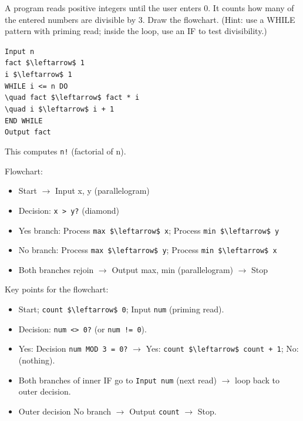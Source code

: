 \documentclass[11pt]{article}
\begin{document}
\begin{exercice}
A program reads positive integers until the user enters 0. It counts how many of the entered numbers are divisible by 3. Draw the flowchart. (Hint: use a WHILE pattern with priming read; inside the loop, use an IF to test divisibility.)
\end{exercice}

\begin{corrige}[Exercise 1]
\begin{center}
\texttt{Input n}\\
\texttt{fact \$\textbackslash{}leftarrow\$ 1}\\
\texttt{i \$\textbackslash{}leftarrow\$ 1}\\
\texttt{WHILE i <= n DO}\\
\texttt{\textbackslash{}quad fact \$\textbackslash{}leftarrow\$ fact * i}\\
\texttt{\textbackslash{}quad i \$\textbackslash{}leftarrow\$ i + 1}\\
\texttt{END WHILE}\\
\texttt{Output fact}
\end{center}
This computes \texttt{n!} (factorial of n).
\end{corrige}

\begin{corrige}[Exercise 2]
Flowchart:
\begin{itemize}
    \item Start $\to$ Input x, y (parallelogram)
    \item Decision: \texttt{x > y?} (diamond)
    \item Yes branch: Process \texttt{max \$\textbackslash{}leftarrow\$ x}; Process \texttt{min \$\textbackslash{}leftarrow\$ y}
    \item No branch: Process \texttt{max \$\textbackslash{}leftarrow\$ y}; Process \texttt{min \$\textbackslash{}leftarrow\$ x}
    \item Both branches rejoin $\to$ Output max, min (parallelogram) $\to$ Stop
\end{itemize}
\end{corrige}

\begin{corrige}[Exercise 3]
Key points for the flowchart:
\begin{itemize}
    \item Start; \texttt{count \$\textbackslash{}leftarrow\$ 0}; Input \texttt{num} (priming read).
    \item Decision: \texttt{num <> 0?} (or \texttt{num != 0}).
    \item Yes: Decision \texttt{num MOD 3 = 0?} $\to$ Yes: \texttt{count \$\textbackslash{}leftarrow\$ count + 1}; No: (nothing).
    \item Both branches of inner IF go to \texttt{Input num} (next read) $\to$ loop back to outer decision.
    \item Outer decision No branch $\to$ Output \texttt{count} $\to$ Stop.
\end{itemize}
\end{corrige}
\end{document}
